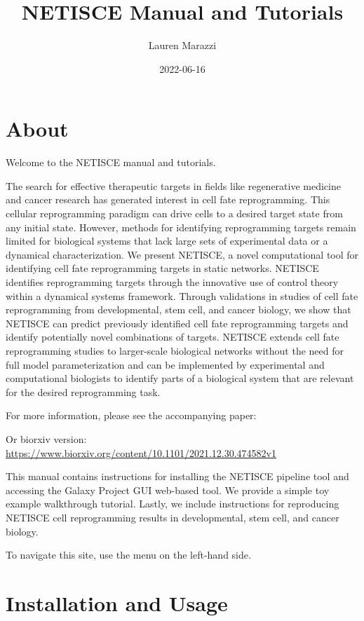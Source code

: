 \documentclass[
]{book}
\title{NETISCE Manual and Tutorials}
\author{Lauren Marazzi}
\date{2022-06-16}
\begin{document}
\maketitle

{
\setcounter{tocdepth}{1}
\tableofcontents
}
\hypertarget{about}{%
\chapter{About}\label{about}}

Welcome to the NETISCE manual and tutorials.

The search for effective therapeutic targets in fields like regenerative medicine and cancer research has generated interest in cell fate reprogramming. This cellular reprogramming paradigm can drive cells to a desired target state from any initial state. However, methods for identifying reprogramming targets remain limited for biological systems that lack large sets of experimental data or a dynamical characterization. We present NETISCE, a novel computational tool for identifying cell fate reprogramming targets in static networks. NETISCE identifies reprogramming targets through the innovative use of control theory within a dynamical systems framework. Through validations in studies of cell fate reprogramming from developmental, stem cell, and cancer biology, we show that NETISCE can predict previously identified cell fate reprogramming targets and identify potentially novel combinations of targets. NETISCE extends cell fate reprogramming studies to larger-scale biological networks without the need for full model parameterization and can be implemented by experimental and computational biologists to identify parts of a biological system that are relevant for the desired reprogramming task.

For more information, please see the accompanying paper:

Or biorxiv version: \url{https://www.biorxiv.org/content/10.1101/2021.12.30.474582v1}

This manual contains instructions for installing the NETISCE pipeline tool and accessing the Galaxy Project GUI web-based tool. We provide a simple toy example walkthrough tutorial. Lastly, we include instructions for reproducing NETISCE cell reprogramming results in developmental, stem cell, and cancer biology.

To navigate this site, use the menu on the left-hand side.

\hypertarget{installation-and-usage}{%
\chapter{Installation and Usage}\label{installation-and-usage}}
\end{document}
